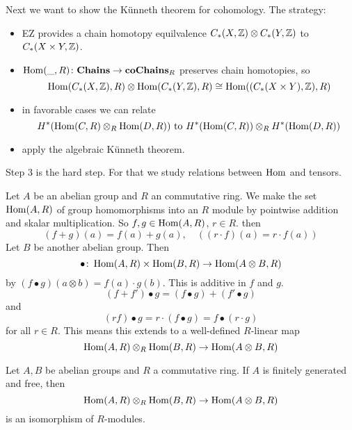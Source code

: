 \documentclass[language=english]{TemplateLecture}
\begin{document}
Next we want to show the Künneth theorem for cohomology. The strategy:
\begin{itemize}
    \item EZ provides a chain homotopy equilvalence \(C_*(X, \mathbb{Z}) \otimes C_*(Y, \mathbb{Z})\) to \(C_*(X\times Y, \mathbb{Z})\).
    \item \(\operatorname{Hom}(\_, R) \colon \mathbf{Chains} \to \mathbf{coChains}_R\) preserves chain homotopies, so
    \[\operatorname{Hom}(C_*(X, \mathbb{Z}), R) \otimes \operatorname{Hom}(C_*(Y, \mathbb{Z}), R) \cong \operatorname{Hom}((C_*(X\times Y), \mathbb{Z}), R)\]
    \item in favorable cases we can relate
    \[H^*(\operatorname{Hom}(C, R) \otimes_R \operatorname{Hom}(D, R)) \text{ to } H^*(\operatorname{Hom}(C,R)) \otimes_R H^*(\operatorname{Hom}(D,R))\]
    \item apply the algebraic Künneth theorem.
\end{itemize}

Step 3 is the hard step. For that we study relations between \(\operatorname{Hom}\) and tensors.

Let \(A\) be an abelian group and \(R\) an commutative ring. We make the set \(\operatorname{Hom}(A,R)\) of group homomorphisms into an \(R\) module by pointwise addition and skalar multiplication. So \(f,g \in \operatorname{Hom}(A,R)\), \(r \in R\). then
\[(f+g)(a) = f(a) + g(a), \quad ((r\cdot f)(a) = r\cdot f(a))\]
Let \(B\) be another abelian group. Then
\[\bullet \colon \operatorname{Hom}(A,R) \times \operatorname{Hom}(B,R) \to \operatorname{Hom}(A\otimes B, R)\]
by \((f\bullet g)(a\otimes b) = f(a) \cdot g(b)\). This is additive in \(f\) and \(g\).
\[(f+f') \bullet g = (f\bullet g) + (f' \bullet g)\]
and
\[(rf) \bullet g = r \cdot (f\bullet g) = f \bullet (r\cdot g)\]
for all \(r \in R\).
This means this extends to a well-defined \(R\)-linear map
\[\operatorname{Hom}(A,R) \otimes_R \operatorname{Hom}(B,R) \to \operatorname{Hom}(A\otimes B, R)\]
\begin{proposition}
    Let \(A,B\) be abelian groups and \(R\) a commutative ring. If \(A\) is finitely generated and free, then
    \[\operatorname{Hom}(A, R) \otimes_R \operatorname{Hom}(B,R) \to \operatorname{Hom}(A\otimes B, R)\]
    is an isomorphism of \(R\)-modules.
\end{proposition}
\end{document}

